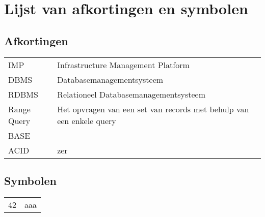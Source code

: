 \chapter{Lijst van afkortingen en symbolen}
\section*{Afkortingen}
\begin{flushleft}
  \renewcommand{\arraystretch}{1.1}
  \begin{tabularx}{\textwidth}{@{}p{12mm}X@{}}
    IMP   & Infrastructure Management Platform \\
    DBMS   & Databasemanagementsysteem \\
    RDBMS   & Relationeel Databasemanagementsysteem \\
    Range Query & Het opvragen van een set van records met behulp van een enkele query \\
    BASE & \\
    ACID & zer
  \end{tabularx}
\end{flushleft}
\section*{Symbolen}
\begin{flushleft}
  \renewcommand{\arraystretch}{1.1}
  \begin{tabularx}{\textwidth}{@{}p{12mm}X@{}}
    42    & aaa \\
  \end{tabularx}
\end{flushleft}